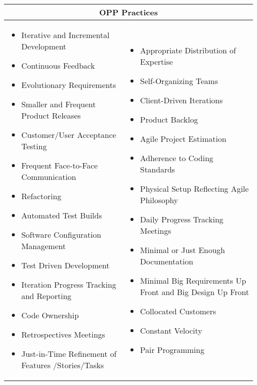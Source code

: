 \begin{table} [H]
\begin{tabular}{| p{7.5cm}  p{7.5cm} |}
	\hline
	\multicolumn{2}{|c|}{\textbf{OPP Practices}}  \\ \hline
     	\begin{itemize}
     		\item Iterative and Incremental Development 
     		\item Continuous Feedback 
     		\item Evolutionary Requirements 
     		\item Smaller and Frequent Product Releases 
     		\item Customer/User Acceptance Testing 
     		\item Frequent Face-to-Face Communication
     		\item Refactoring 
     		\item Automated Test Builds
     		\item Software Configuration Management 
     		\item Test Driven Development
     		\item Iteration Progress Tracking and Reporting 
     		\item Code Ownership 
     		\item Retrospectives Meetings 
     		\item Just-in-Time Refinement of Features /Stories/Tasks 
     	\end{itemize} 
     	& \begin{itemize}
     	 	\item Appropriate Distribution of Expertise
  			\item Self-Organizing Teams
     		\item Client-Driven Iterations 
     		\item Product Backlog 
     		\item Agile Project Estimation 
     		\item Adherence to Coding Standards 
     		\item Physical Setup Reflecting Agile Philosophy
     		\item Daily Progress Tracking Meetings 
     		\item Minimal or Just Enough Documentation 
     		\item Minimal Big Requirements Up Front and Big Design Up Front 
     		\item Collocated Customers
     		\item Constant Velocity 
     		\item Pair Programming  
 		\end{itemize} 
     \\ \hline
\end{tabular}
\label{table:opp_practices}
\end{table}

